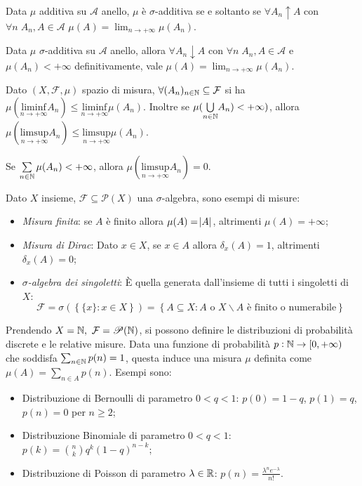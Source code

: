 \begin{exercise}
	Data $\mu$ additiva su $\mathcal{A}$ anello, $\mu$ è $\sigma$-additiva se e soltanto se $\forall A_n \uparrow A$ con $\forall n\; A_n,A \in \mathcal{A}$ $\mu(A)=\lim_{n\to +\infty} \mu(A_n)$.
\end{exercise}
\begin{exercise}
	Data $\mu$ $\sigma$-additiva su $\mathcal{A}$ anello, allora $\forall A_n \downarrow A$ con $\forall n\; A_n,A \in \mathcal{A}$ e $\mu(A_n) < + \infty$ definitivamente, vale $\mu(A)=\lim_{n\rightarrow +\infty} \mu(A_n)$.
\end{exercise}
\begin{exercise}
	Dato $(X,\mathcal{F}, \mu)$ spazio di misura, $\forall (A_n)_{n\in\mathbb{N}}\subseteq\mathcal{F}$  si ha $\mu(\underset{n\rightarrow +\infty}{\text{liminf}} A_n) \leq \underset{n\rightarrow +\infty}{\text{liminf}} \mu (A_n)$. Inoltre se $\mu(\underset{n\in\mathbb{N}}{\bigcup} A_n) <+\infty)$, allora $\mu(\underset{n\rightarrow +\infty}{\text{limsup}} A_n) \leq \underset{n\rightarrow +\infty}{\text{limsup}} \mu (A_n)$.
\end{exercise}
\begin{exercise}
	Se $\sum\limits_{n\in\mathbb{N}} \mu(A_n) < +\infty$, allora $\mu(\underset{n\rightarrow +\infty}{\text{limsup}} A_n)=0$.
\end{exercise}
\begin{example}
	Dato $X$ insieme, $\mathcal{F}\subseteq \mathscr{P}(X)$ una $\sigma$-algebra, sono esempi di misure:
	\begin{itemize}
		\item \emph{Misura finita}: se $A$ è finito allora $\mu(A)=\abs{A}$, altrimenti $\mu(A)=+\infty$;
		\item \emph{Misura di Dirac}: Dato $x\in X$, se $x\in A$ allora $\delta_x(A)=1$, altrimenti $\delta_x(A)=0$;
		\item \emph{$\sigma$-algebra dei singoletti}: È quella generata dall'insieme di tutti i singoletti di $X$:
		\[ \mathcal{F} = \sigma\left( \left\{ \{x\} : x\in X \right\} \right) = \left\{ A\subseteq X : A \text{ o } X\backslash A \text{ è finito o numerabile} \right\} \]
	\end{itemize}
\end{example}
\begin{example}
	Prendendo $X=\mathbb{N},\ \mathcal{F} =\mathscr{P}(\mathbb{N})$, si possono definire le distribuzioni di probabilità discrete e le relative misure. Data una funzione di probabilità $p: \mathbb{N} \rightarrow [0,+\infty)$ che soddisfa $\sum_{n\in\mathbb{N}} p(n)=1$, questa induce una misura $\mu$ definita come $\mu(A)=\sum_{n\in A} p(n)$. Esempi sono:
	\begin{itemize}
	\item Distribuzione di Bernoulli di parametro $0<q<1$: $p(0)=1-q$, $p(1)=q$, $p(n)=0$ per $n\geq 2$;
	\item Distribuzione Binomiale di parametro $0<q<1$: $\displaystyle p(k)=\binom{n}{k} q^k (1-q)^{n-k}$;
	\item Distribuzione di Poisson di parametro $\lambda\in\mathbb{R}$: $\displaystyle p(n)=\frac{\lambda^ne^{-\lambda}}{n!}$.
	\end{itemize}
\end{example}
